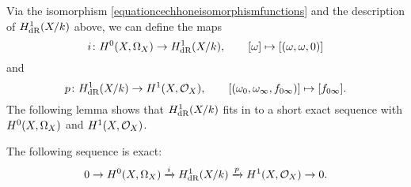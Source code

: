 Via the isomorphism \eqref{equationcechhoneisomorphismfunctions} and the description of $H_{\text {dR}}^1(X/k)$ above, we can define the maps
    \begin{equation}\label{equationinjectionofhzerointoderham} 
    i \colon {H^0(X,\Omega_X)} \rightarrow H_{\text {dR}}^1(X/k), \qquad [\omega] \mapsto [(\omega, \omega, 0)]
    \end{equation}
and 
    \begin{equation}\label{equationsurjectionofderhamontohone}
    p \colon H_{\text {dR}}^1(X/k) \rightarrow H^1(X,\mathcal{O}_X), \qquad [(\omega_0, \omega_\infty, f_{0 \infty})] \mapsto [f_{0 \infty}].
    \end{equation}
The following lemma shows that $H_{\text {dR}}^1(X/k)$ fits in to a short exact sequence with ${H^0(X,\Omega_X)}$ and $H^1(X,\mathcal{O}_X)$.
    
    \begin{prop}\label{propshortexactsequence}
    The following sequence is exact:
        \begin{equation*}
        0 \rightarrow H^0(X,\Omega_X) \xrightarrow{i} H_{\text {dR}}^1(X/k) \xrightarrow{p} H^1(X,{\cal O}_X) \rightarrow 0.
        \end{equation*}
    \end{prop}
